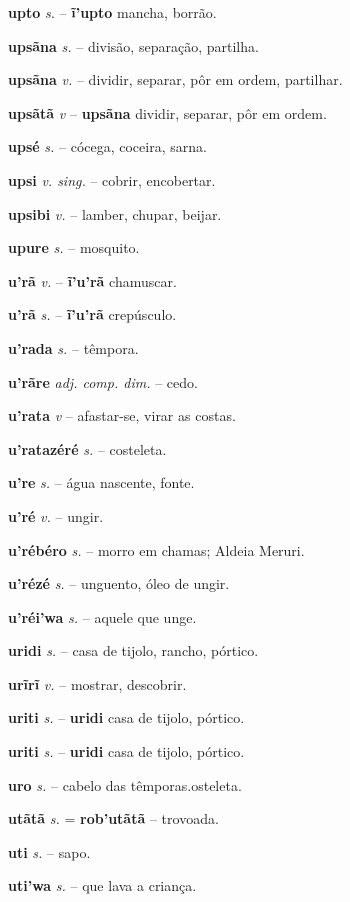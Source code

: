\textbf{upto} \textit{s.} -- \textbf{ĩ'upto} mancha, borrão.

\textbf{upsãna} \textit{s.} -- divisão, separação, partilha.

\textbf{upsãna} \textit{v.} -- dividir, separar, pôr em ordem, partilhar.

\textbf{upsãtã} \textit{v} -- \textbf{upsãna} dividir, separar, pôr em ordem.

\textbf{upsé} \textit{s.} -- cócega, coceira, sarna.

\textbf{upsi} \textit{v. sing.} -- cobrir, encobertar.

\textbf{upsibi} \textit{v.} -- lamber, chupar, beijar.

\textbf{upure} \textit{s.} -- mosquito.

\textbf{u'rã} \textit{v.} -- \textbf{ĩ'u'rã} chamuscar.

\textbf{u'rã} \textit{s.} -- \textbf{ĩ'u'rã} crepúsculo.

\textbf{u'rada} \textit{s.} -- têmpora.

\textbf{u'rãre} \textit{adj. comp. dim.} -- cedo.

\textbf{u'rata} \textit{v} -- afastar-se, virar as costas.

\textbf{u'ratazéré} \textit{s.} -- costeleta.

\textbf{u're} \textit{s.} -- água nascente, fonte.

\textbf{u'ré} \textit{v.} -- ungir.

\textbf{u'rébéro} \textit{s.} -- morro em chamas; Aldeia Meruri.

\textbf{u'rézé} \textit{s.} -- unguento, óleo de ungir.

\textbf{u'réi'wa} \textit{s.} -- aquele que unge.

\textbf{uridi} \textit{s.} -- casa de tijolo, rancho, pórtico.

\textbf{urĩrĩ} \textit{v.} -- mostrar, descobrir.

\textbf{uriti} \textit{s.} -- \textbf{uridi} casa de tijolo, pórtico.

\textbf{uriti} \textit{s.} -- \textbf{uridi} casa de tijolo, pórtico.

\textbf{uro} \textit{s.} -- cabelo das têmporas.osteleta.

\textbf{utãtã} \textit{s.} = \textbf{rob'utãtã} -- trovoada.

\textbf{uti} \textit{s.} -- sapo.

\textbf{uti'wa} \textit{s.} -- que lava a criança.

